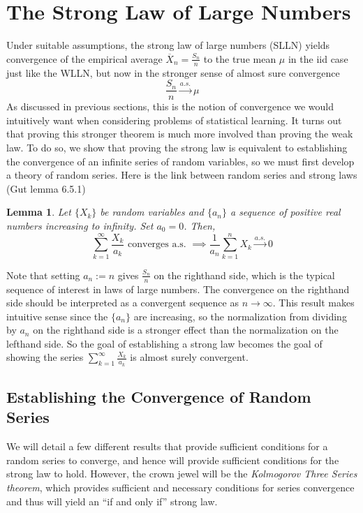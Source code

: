 \documentclass[12pt]{article}
\newtheorem{lemma}{Lemma}
\begin{document}
\section{The Strong Law of Large Numbers}
Under suitable assumptions, the strong law of large numbers (SLLN) yields convergence of the empirical average $\overline{X}_n = \frac{S_n}{n}$ to the true mean $\mu$ in the iid case just like the WLLN, but now in the stronger 
sense of almost sure convergence
\[\frac{S_n}{n} \overset{a.s.}{\to} \mu\]
As discussed in previous sections, this is the notion of convergence we would intuitively want when considering problems of statistical learning. It turns out that proving this stronger theorem is much more involved than 
proving the weak law. To do so, we show that proving the strong law is equivalent to establishing the convergence of an infinite series of random variables, so we must first develop a theory of random series. Here is the 
link between random series and strong laws (Gut lemma 6.5.1)
\begin{lemma} \label{series_convergence_lemma}
Let $\{X_k\}$ be random variables and $\{a_n\}$ a sequence of positive real numbers increasing to infinity. Set $a_0 = 0$. Then, 
\[\sum_{k = 1}^{\infty} \frac{X_k}{a_k} \text{ converges a.s. } \implies \frac{1}{a_n} \sum_{k = 1}^{n} X_k \overset{a.s.}{\to} 0\]
\end{lemma}
Note that setting $a_n := n$ gives $\frac{S_n}{n}$ on the righthand side, which is the typical sequence of interest in laws of large numbers. The convergence on the righthand side should be interpreted 
as a convergent sequence as $n \to \infty$. This result makes intuitive sense since the $\{a_n\}$ are increasing, so the normalization from dividing by $a_n$ on the righthand side is a stronger effect than 
the normalization on the lefthand side. So the goal of establishing a strong law becomes the goal of showing the series $\sum_{k = 1}^{\infty} \frac{X_k}{a_k}$ is almost surely convergent. 

\subsection{Establishing the Convergence of Random Series}
We will detail a few different results that provide sufficient conditions for a random series to converge, and hence will provide sufficient conditions for the strong law to hold. However, the crown jewel will 
be the \textit{Kolmogorov Three Series theorem}, which provides sufficient and necessary conditions for series convergence and thus will yield an ``if and only if'' strong law.  
\end{document}
